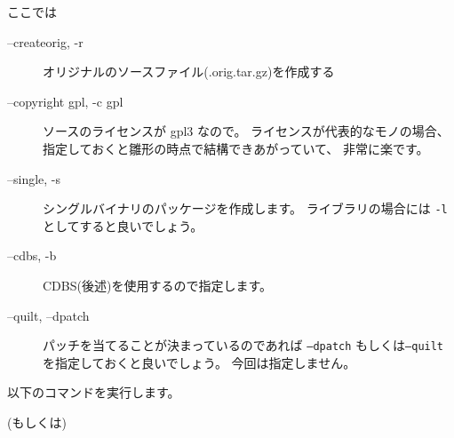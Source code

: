 \documentclass[mingoth,a4paper]{jsarticle}
\begin{document}
ここでは
\begin{description}
      \item[--createorig, -r] 
    オリジナルのソースファイル(.orig.tar.gz)を作成する
      \item[--copyright gpl, -c gpl] ソースのライセンスが gpl3 なので。
    ライセンスが代表的なモノの場合、
    指定しておくと雛形の時点で結構できあがっていて、 非常に楽です。
      \item[--single,  -s] シングルバイナリのパッケージを作成します。
    ライブラリの場合には {\tt -l} としてすると良いでしょう。
      \item[--cdbs, -b] CDBS(後述)を使用するので指定します。
    \item[--quilt, --dpatch]
  パッチを当てることが決まっているのであれば
  {\tt --dpatch} もしくは{\tt --quilt} を指定しておくと良いでしょう。
  今回は指定しません。
\end{description}
以下のコマンドを実行します。
\begin{commandline}
(もしくは)
\end{commandline}
  
\end{document}

